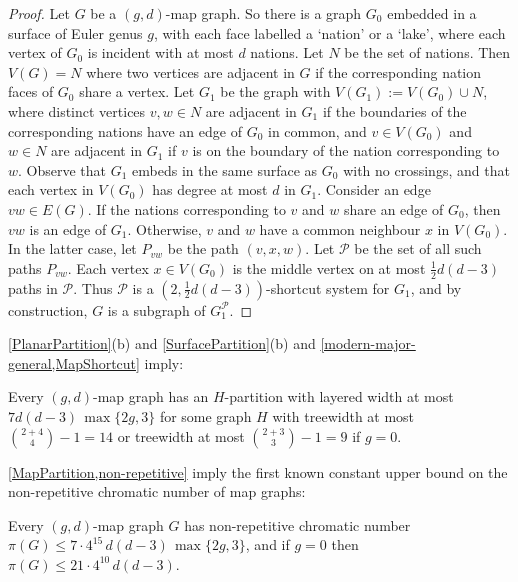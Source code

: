 \documentclass{patmorin}
\newcommand{\PP}{\mathcal{P}}
\renewcommand{\le}{\leqslant}
\begin{document}
\begin{proof}
Let $G$ be a $(g,d)$-map graph. So there is a graph $G_0$ embedded in a surface of Euler genus $g$, with each face labelled a `nation' or a `lake', where each vertex of $G_0$ is incident with at most $d$ nations. Let $N$ be the set of nations. Then $V(G)=N$ where two vertices are adjacent in $G$ if the corresponding nation faces of $G_0$ share a vertex. Let $G_1$ be the graph with $V(G_1):=V(G_0) \cup N$, where distinct vertices $v,w\in N$ are adjacent in $G_1$ if the boundaries of the corresponding nations have an edge of $G_0$ in common, and $v\in V(G_0)$ and $w\in N$ are adjacent in $G_1$ if $v$ is on the boundary of the nation corresponding to $w$. Observe that $G_1$ embeds in the same surface as $G_0$ with no crossings, and that each vertex in $V(G_0)$ has degree at most $d$ in $G_1$. Consider an edge $vw\in E(G)$. If the nations corresponding to $v$ and $w$ share an edge of $G_0$, then $vw$ is an edge of $G_1$. Otherwise,  $v$ and $w$ have a common neighbour $x$ in $V(G_0)$. In the latter case, let $P_{vw}$ be the path $(v,x,w)$. Let $\PP$ be the set of all such paths $P_{vw}$. Each vertex $x\in V(G_0)$ is the middle vertex on at most $\tfrac12 d(d-3)$  paths in $\PP$. Thus $\PP$ is a $(2,\tfrac12 d(d-3))$-shortcut system for $G_1$, and by construction, $G$ is a subgraph of $G_1^\PP$.
\end{proof}

\cref{PlanarPartition}(b)  and \cref{SurfacePartition}(b) and \cref{modern-major-general,MapShortcut} imply:

\begin{thm}
\label{MapPartition}
Every $(g,d)$-map graph has an $H$-partition with layered width at most 
$7d(d-3)\, \max\{2g,3\}$ for some graph $H$ with treewidth at most $\binom{2+4}{4}-1=14$ 
or treewidth at most $\binom{2+3}{3}-1=9$ if $g=0$.
%
%
%
\end{thm}

\cref{MapPartition,non-repetitive} imply the first known constant upper bound on the
non-repetitive chromatic number of map graphs:

\begin{cor}
Every $(g,d)$-map graph $G$ has non-repetitive chromatic number 
$\pi(G) \le  7 \cdot 4^{15} \, d(d-3)\, \max\{2g,3\}$, and if $g=0$ then 
$\pi(G) \le  21 \cdot 4^{10} \, d(d-3)$.
\end{cor}
\end{document}
